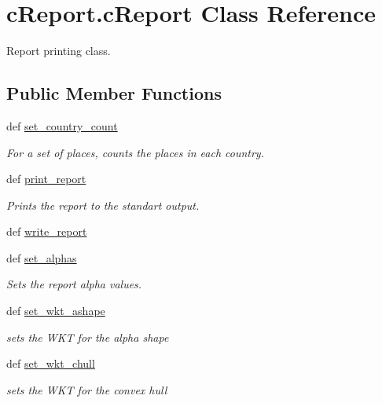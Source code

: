 \hypertarget{classcReport_1_1cReport}{\section{c\-Report.\-c\-Report \-Class \-Reference}
\label{classcReport_1_1cReport}
}


\-Report printing class.  


\subsection*{\-Public \-Member \-Functions}
\begin{DoxyCompactItemize}
\item 
def \hyperlink{classcReport_1_1cReport_a6c99e291e57740c632c41fcc9b8603a6}{set\-\_\-country\-\_\-count}
\begin{DoxyCompactList}\small\item\em \-For a set of places, counts the places in each country. \end{DoxyCompactList}\item 
def \hyperlink{classcReport_1_1cReport_ae11a6d61ee12ec0b6504becca679a9bc}{print\-\_\-report}
\begin{DoxyCompactList}\small\item\em \-Prints the report to the standart output. \end{DoxyCompactList}\item 
def \hyperlink{classcReport_1_1cReport_a2522ef0f563ba64badb9eaeae00ead23}{write\-\_\-report}
\item 
def \hyperlink{classcReport_1_1cReport_a6f447843cad3090b4b869451d1c59fe3}{set\-\_\-alphas}
\begin{DoxyCompactList}\small\item\em \-Sets the report alpha values. \end{DoxyCompactList}\item 
def \hyperlink{classcReport_1_1cReport_ac42726e950b1d2fa9553a6a90b64424d}{set\-\_\-wkt\-\_\-ashape}
\begin{DoxyCompactList}\small\item\em sets the \-W\-K\-T for the alpha shape \end{DoxyCompactList}\item 
def \hyperlink{classcReport_1_1cReport_a7b5b91a2fc9871144143ab3eafad83f7}{set\-\_\-wkt\-\_\-chull}
\begin{DoxyCompactList}\small\item\em sets the \-W\-K\-T for the convex hull \end{DoxyCompactList}\item 

\end{DoxyCompactItemize}

